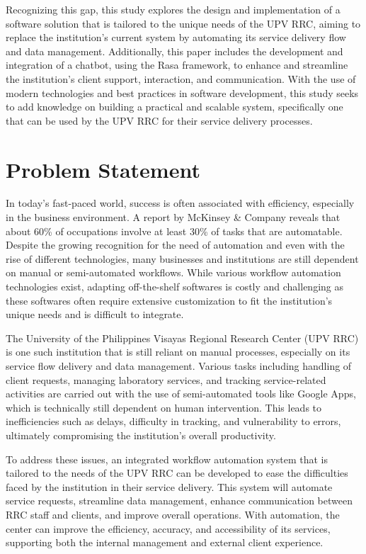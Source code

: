 Recognizing this gap, this study explores the design and implementation of a software solution that is tailored to the unique needs of the UPV RRC, aiming to replace the institution’s current system by automating its service delivery flow and data management. Additionally, this paper includes the development and integration of a chatbot, using the Rasa framework, to enhance and streamline the institution’s client support, interaction, and communication. With the use of modern technologies and best practices in software development, this study seeks to add knowledge on building a practical and scalable system, specifically one that can be used by the UPV RRC for their service delivery processes.

\section{Problem Statement}

In today’s fast-paced world, success is often associated with efficiency, especially in the business environment. A report by McKinsey \& Company \cite{manyika2017} reveals that about 60\% of occupations involve at least 30\% of tasks that are automatable. Despite the growing recognition for the need of automation and even with the rise of different technologies, many businesses and institutions are still dependent on manual or semi-automated workflows. While various workflow automation technologies exist, adapting off-the-shelf softwares is costly and challenging as these softwares often require extensive customization to fit the institution’s unique needs and is difficult to integrate. 

The University of the Philippines Visayas Regional Research Center (UPV RRC) is one such institution that is still reliant on manual processes, especially on its service flow delivery and data management. Various tasks including handling of client requests, managing laboratory services, and tracking service-related activities are carried out with the use of semi-automated tools like Google Apps, which is technically still dependent on human intervention. This leads to inefficiencies such as delays, difficulty in tracking, and vulnerability to errors, ultimately compromising the institution’s overall productivity.

To address these issues, an integrated workflow automation system that is tailored to the needs of the UPV RRC can be developed to ease the difficulties faced by the institution in their service delivery. This system will automate service requests, streamline data management, enhance communication between RRC staff and clients, and improve overall operations. With automation, the center can improve the efficiency, accuracy, and accessibility of its services, supporting both the internal management and external client experience.

